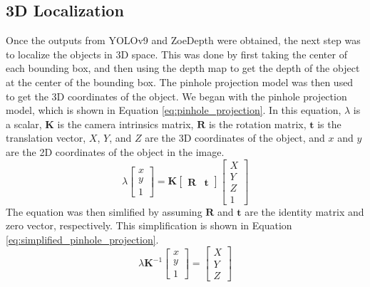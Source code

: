 \subsection{3D Localization}
Once the outputs from YOLOv9 and ZoeDepth were obtained, the next step was to localize the objects in 3D space. This was done by first taking the center of each bounding box, and then using the depth map to get the depth of the object at the center of the bounding box. The pinhole projection model was then used to get the 3D coordinates of the object.
We began with the pinhole projection model, which is shown in Equation \ref{eq:pinhole_projection}. In this equation, $\lambda$ is a scalar, $\mathbf{K}$ is the camera intrinsics matrix, $\mathbf{R}$ is the rotation matrix, $\mathbf{t}$ is the translation vector, $X$, $Y$, and $Z$ are the 3D coordinates of the object, and $x$ and $y$ are the 2D coordinates of the object in the image.
\begin{equation}\label{eq:pinhole_projection}
    \lambda\begin{bmatrix}
        x \\
        y \\
        1
    \end{bmatrix}
    =
    \mathbf{K}
    \begin{bmatrix}
        \mathbf{R} & \mathbf{t}
    \end{bmatrix}
    \begin{bmatrix}
        X \\
        Y \\
        Z \\
        1
    \end{bmatrix}
\end{equation}
The equation was then simlified by assuming $\mathbf{R}$ and $\mathbf{t}$ are the identity matrix and zero vector, respectively. This simplification is shown in Equation \ref{eq:simplified_pinhole_projection}.
\begin{equation}\label{eq:simplified_pinhole_projection}
    \lambda \mathbf{K}^{-1}\begin{bmatrix}
        x \\
        y \\
        1
    \end{bmatrix}
    =
    \begin{bmatrix}
        X \\
        Y \\
        Z
    \end{bmatrix}
\end{equation}
